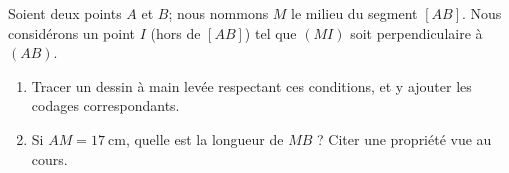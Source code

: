 
\begin{exercice}\label{exo2smath-0082}

    Soient deux points \( A\) et \( B\); nous nommons \( M\) le milieu du segment \( [AB]\). Nous considérons un point \( I\) (hors de \( [AB]\)) tel que \( (MI)\) soit perpendiculaire à \( (AB)\).

    \begin{enumerate}
        \item
            Tracer un dessin à main levée respectant ces conditions, et y ajouter les codages correspondants.
        \item       
            Si \( AM=\SI{17}{\centi\meter}\), quelle est la longueur de \( MB\) ? Citer une propriété vue au cours.
    \end{enumerate}

\end{exercice}
